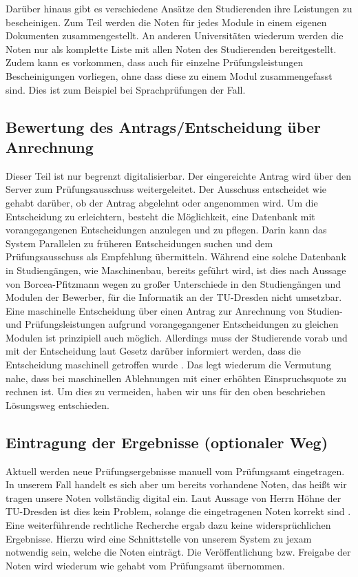 Darüber hinaus gibt es verschiedene Ansätze den Studierenden ihre Leistungen zu bescheinigen. Zum Teil werden die Noten für jedes Module in einem eigenen Dokumenten zusammengestellt. An anderen Universitäten wiederum werden die Noten nur als komplette Liste mit allen Noten des Studierenden bereitgestellt. Zudem kann es vorkommen, dass auch für einzelne Prüfungsleistungen Bescheinigungen vorliegen, ohne dass diese zu einem Modul zusammengefasst sind. Dies ist zum Beispiel bei Sprachprüfungen der Fall. 

\subsection{Bewertung des Antrags/Entscheidung über Anrechnung}
Dieser Teil ist nur begrenzt digitalisierbar. Der eingereichte Antrag wird über den Server zum Prüfungsausschuss weitergeleitet. Der Ausschuss entscheidet wie gehabt darüber, ob der Antrag abgelehnt oder angenommen wird. Um die Entscheidung zu erleichtern, besteht die Möglichkeit, eine Datenbank mit vorangegangenen Entscheidungen anzulegen und zu pflegen. Darin kann das System Parallelen zu früheren Entscheidungen suchen und dem Prüfungsausschuss als Empfehlung übermitteln. Während eine solche Datenbank in Studiengängen, wie Maschinenbau, bereits geführt wird, ist dies nach Aussage von Borcea-Pfitzmann wegen zu großer Unterschiede in den Studiengängen und Modulen der Bewerber, für die Informatik an der TU-Dresden nicht umsetzbar.
Eine maschinelle Entscheidung über einen Antrag zur Anrechnung von Studien- und Prüfungsleistungen aufgrund vorangegangener Entscheidungen zu gleichen Modulen ist prinzipiell auch möglich. Allerdings muss der Studierende vorab und mit der Entscheidung laut Gesetz darüber informiert werden, dass die Entscheidung maschinell getroffen wurde \parencite{dsgvo}. Das legt wiederum die Vermutung nahe, dass bei maschinellen Ablehnungen mit einer erhöhten Einspruchsquote zu rechnen ist. Um dies zu vermeiden, haben wir uns für den oben beschrieben Lösungsweg entschieden.

\subsection{Eintragung der Ergebnisse (optionaler Weg)}
Aktuell werden neue Prüfungsergebnisse manuell vom Prüfungsamt eingetragen. In unserem Fall handelt es sich aber um bereits vorhandene Noten, das heißt wir tragen unsere Noten vollständig digital ein. Laut Aussage von Herrn Höhne der TU-Dresden ist dies kein Problem, solange die eingetragenen Noten korrekt sind \parencite{email}. Eine weiterführende rechtliche Recherche ergab dazu keine widersprüchlichen Ergebnisse.
Hierzu wird eine Schnittstelle von unserem System zu jexam notwendig sein, welche die Noten einträgt. Die Veröffentlichung bzw. Freigabe der Noten wird wiederum wie gehabt vom Prüfungsamt übernommen.

